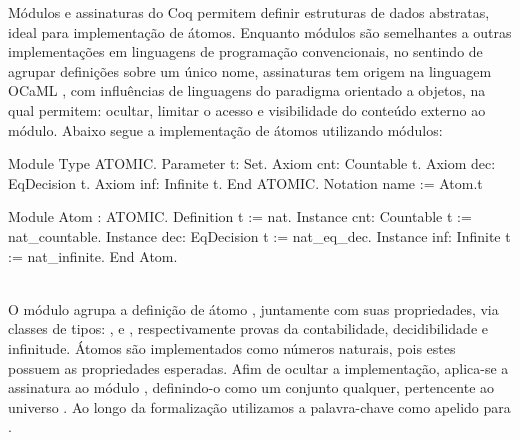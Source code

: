 Módulos e assinaturas do Coq permitem definir estruturas de dados abstratas, ideal para implementação de átomos. Enquanto módulos são semelhantes a outras implementações em linguagens de programação convencionais, no sentindo de agrupar definições sobre um único nome, assinaturas tem origem na linguagem OCaML \cite{OCAML}, com influências de linguagens do paradigma orientado a objetos, na qual permitem: ocultar, limitar o acesso e visibilidade do conteúdo externo ao módulo. Abaixo segue a implementação de átomos utilizando módulos:
\vspace*{.4em}\\
\begin{minipage}[t]{0.5\linewidth}
\begin{coqcode}
Module Type ATOMIC.
  Parameter t: Set.
  Axiom cnt: Countable t.
  Axiom dec: EqDecision t.
  Axiom inf: Infinite t.
End ATOMIC.
Notation name := Atom.t
\end{coqcode}
\end{minipage}
\hspace{-5em}
\begin{minipage}[t]{0.5\linewidth}
\begin{coqcode}
Module Atom : ATOMIC.
  Definition t := nat.
  Instance cnt: Countable t := nat_countable.
  Instance dec: EqDecision t := nat_eq_dec.
  Instance inf: Infinite t := nat_infinite.
End Atom.
\end{coqcode}
\end{minipage}
\vspace*{1em}\\
O módulo  agrupa a definição de átomo , juntamente com suas propriedades, via classes de tipos: ,  e , respectivamente provas da contabilidade, decidibilidade e infinitude. Átomos são implementados como números naturais, pois estes possuem as propriedades esperadas. Afim de ocultar a implementação, aplica-se a assinatura  ao módulo , definindo-o como um conjunto qualquer, pertencente ao universo . Ao longo da formalização utilizamos a palavra-chave  como apelido para . 

